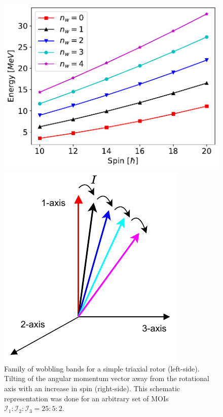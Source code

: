 \documentclass[11pt]{article}
\begin{document}
\begin{figure}
\centering
\begin{minipage}{.6\textwidth}
  \centering
  \includegraphics[width=1\linewidth]{figs/simple_wobbling_spectrum.pdf}
\end{minipage}%
\begin{minipage}{.4\textwidth}
  \centering
 \includegraphics[width=0.8\linewidth]{figs/wobbling_tilting_axis.pdf}
\end{minipage}
\caption{Family of wobbling bands for a simple triaxial rotor (left-side). Tilting of the angular momentum vector away from the rotational axis with an increase in spin (right-side). This schematic representation was done for an arbitrary set of MOIs $\mathcal{I}_1:\mathcal{I}_2:\mathcal{I}_3=25:5:2$.}
\label{simple-wobbling-family}
\end{figure}
\end{document}
